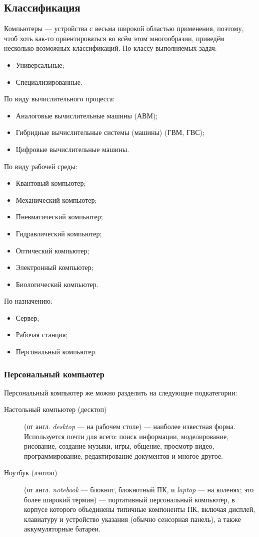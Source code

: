 \subsection{Классификация}\label{base:introduction:computer:classification}
Компьютеры --- устройства с весьма широкой областью применения, поэтому, чтоб хоть как-то ориентироваться во всём этом многообразии, приведём несколько возможных классификаций.
По классу выполняемых задач:
\begin{itemize}
 \item Универсальные;
 \item Специализированные.
\end{itemize}
По виду вычислительного процесса:
\begin{itemize}
 \item Аналоговые вычислительные машины (АВМ);
 \item Гибридные вычислительные системы (машины) (ГВМ, ГВС);
 \item Цифровые вычислительные машины.
\end{itemize}
По виду рабочей среды:
\begin{itemize}
 \item Квантовый компьютер;
 \item Механический компьютер;
 \item Пневматический компьютер;
 \item Гидравлический компьютер;
 \item Оптический компьютер;
 \item Электронный компьютер;
 \item Биологический компьютер.
\end{itemize}
По назначению:
\begin{itemize}
 \item Сервер;
 \item Рабочая станция;
 \item Персональный компьютер.
\end{itemize}

\subsubsection{Персональный компьютер}\label{base:introduction:computer:classification:pc}
Персональный компьютер же можно разделить на следующие подкатегории:
\begin{description}
 \item[Настольный компьютер (десктоп)] (от англ. \emph{desktop} --- на рабочем столе) --- наиболее известная форма. Используется почти для всего: поиск информации, моделирование, рисование, создание музыки, игры, общение, просмотр видео, программирование, редактирование документов и многое другое.
 \item[Ноутбук (лэптоп)] (от англ. \emph{notebook} --- блокнот, блокнотный ПК, и \emph{laptop} --- на коленях; это более широкий термин) --- портативный персональный компьютер, в корпусе которого объединены типичные компоненты ПК, включая дисплей, клавиатуру и устройство указания (обычно сенсорная панель), а также аккумуляторные батареи. 
\end{description}
